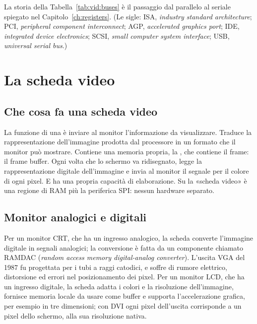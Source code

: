 La storia della Tabella~\ref{tab:vid:buses} è il passaggio dal parallelo al
seriale spiegato nel Capitolo~\ref{ch:registers}. (Le sigle: ISA,
\emph{industry standard architecture}; PCI, \emph{peripheral component
interconnect}; AGP, \emph{accelerated graphics port}; IDE, \emph{integrated
device electronics}; SCSI, \emph{small computer system interface}; USB,
\emph{universal serial bus}.)

\section{La scheda video}

\subsection{Che cosa fa una scheda video}

La funzione di una  è inviare al monitor l'informazione da
visualizzare. Traduce la rappresentazione dell'immagine prodotta dal
processore in un formato che il monitor può mostrare. Contiene una memoria
propria, la , che contiene il frame: il frame buffer. Ogni
volta che lo schermo va ridisegnato, legge la rappresentazione digitale
dell'immagine e invia al monitor il segnale per il colore di ogni pixel. E ha
una propria capacità di elaborazione. Su \prg la «scheda video» è una regione
di RAM più la periferica SPI: nessun hardware separato.

\subsection{Monitor analogici e digitali}

Per un monitor CRT, che ha un ingresso analogico, la scheda converte
l'immagine digitale in segnali analogici; la conversione è fatta da un
componente chiamato RAMDAC (\emph{random access memory digital-analog
converter}). L'uscita VGA del 1987 fu progettata per i tubi a raggi catodici,
e soffre di rumore elettrico, distorsione ed errori nel posizionamento dei
pixel. Per un monitor LCD, che ha un ingresso digitale, la scheda adatta i
colori e la risoluzione dell'immagine, fornisce memoria locale da usare come
buffer e supporta l'accelerazione grafica, per esempio in tre dimensioni; con
DVI ogni pixel dell'uscita corrisponde a un pixel dello schermo, alla sua
risoluzione nativa.


